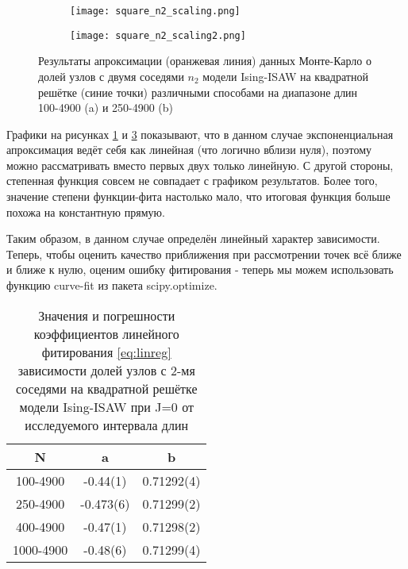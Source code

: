 \begin{figure}[h!]

\begin{subfigure}{0.49\textwidth}
    \texttt{[image: square\_n2\_scaling.png]}
    \caption{}
    \label{fig:square_scale_full}
\end{subfigure}
\hfill
\begin{subfigure}{0.49\textwidth}
    \texttt{[image: square\_n2\_scaling2.png]}
    \caption{}
    \label{fig:square_scale_limited}
\end{subfigure}
\caption{Результаты апроксимации (оранжевая линия) данных Монте-Карло о долей узлов с двумя соседями $n_2$ модели Ising-ISAW на квадратной решётке (синие точки) различными способами на диапазоне длин 100-4900 (a) и 250-4900 (b)}
\end{figure}

Графики на рисунках \ref{fig:square_scale_full} и \ref{fig:square_scale_limited} показывают, что в данном случае экспоненциальная апроксимация ведёт себя как линейная (что логично вблизи нуля), поэтому можно рассматривать вместо первых двух только линейную. С другой стороны, степенная функция совсем не совпадает с графиком результатов. Более того, значение степени функции-фита настолько мало, что итоговая функция больше похожа на константную прямую.

Таким образом, в данном случае определён линейный характер зависимости. Теперь, чтобы оценить качество приближения при рассмотрении точек всё ближе и ближе к нулю, оценим ошибку фитирования - теперь мы можем использовать функцию curve-fit из пакета scipy.optimize.

\begin{table}[h]
    \centering
    \begin{tabular}{|c|c|c|} \hline
        N & a & b  \\ \hline
        100-4900 & -0.44(1) & 0.71292(4) \\ \hline
        250-4900 & -0.473(6) & 0.71299(2) \\ \hline
        400-4900 & -0.47(1) & 0.71298(2) \\ \hline
        1000-4900 & -0.48(6) & 0.71299(4) \\ \hline
    \end{tabular}
    \caption{Значения и погрешности коэффициентов линейного фитирования \eqref{eq:linreg} зависимости долей узлов с 2-мя соседями на квадратной решётке модели Ising-ISAW при J=0 от исследуемого интервала длин}
    \label{tab:a_b_n2_square}
\end{table}

